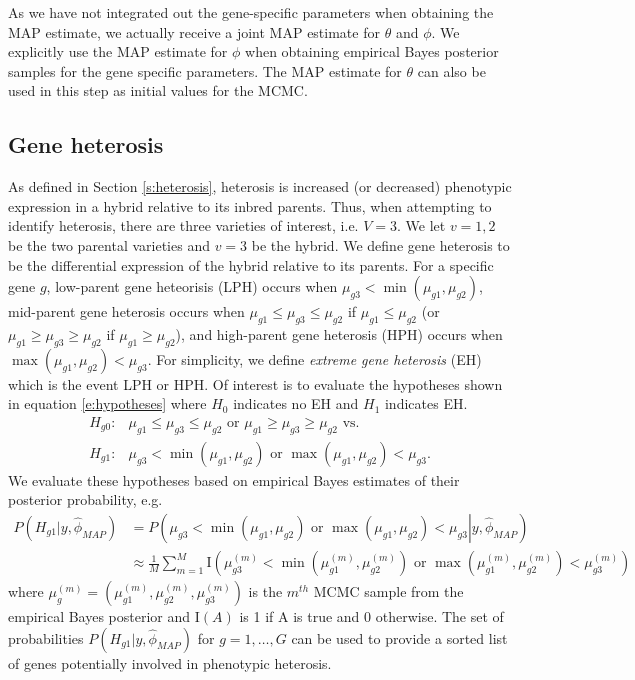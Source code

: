 \documentclass[useAMS,usenatbib,referee]{biom}
\begin{document}
As we have not integrated out the gene-specific parameters when obtaining the MAP estimate, we actually receive a joint MAP estimate for $\theta$ and $\phi$. We explicitly use the MAP estimate for $\phi$ when obtaining empirical Bayes posterior samples for the gene specific parameters. The MAP estimate for $\theta$ can also be used in this step as initial values for the MCMC. 

\subsection{Gene heterosis}
\label{s:gene_heterosis}

As defined in Section \ref{s:heterosis}, heterosis is increased (or decreased) phenotypic expression in a hybrid relative to its inbred parents. Thus, when attempting to identify heterosis, there are three varieties of interest, i.e. $V=3$. We let $v=1,2$ be the two parental varieties and $v=3$ be the hybrid. We define gene heterosis to be the differential expression of the hybrid relative to its parents. For a specific gene $g$, low-parent gene heteorisis (LPH) occurs when $\mu_{g3}< \min(\mu_{g1},\mu_{g2})$, mid-parent gene heterosis occurs when $\mu_{g1}\le \mu_{g3}\le \mu_{g2}$ if $\mu_{g1}\le \mu_{g2}$ (or $\mu_{g1}\ge \mu_{g3}\ge \mu_{g2}$ if $\mu_{g1}\ge \mu_{g2}$), and high-parent gene heterosis (HPH) occurs when $\max(\mu_{g1},\mu_{g2}) < \mu_{g3}$. For simplicity, we define \emph{extreme gene heterosis} (EH) which is the event LPH or HPH. Of interest is to evaluate the hypotheses shown in equation \eqref{e:hypotheses} where $H_0$ indicates no EH and $H_1$ indicates EH. 
\begin{align}
\label{e:hypotheses}
H_{g0}:&\mu_{g1}\le \mu_{g3}\le \mu_{g2} \mbox{ or } \mu_{g1}\ge \mu_{g3}\ge \mu_{g2} \mbox{\ \ vs.\ \ } \nonumber \\
H_{g1}:&\mu_{g3}< \min(\mu_{g1},\mu_{g2}) \mbox{ or } \max(\mu_{g1},\mu_{g2}) < \mu_{g3}.
\end{align}
We evaluate these hypotheses based on empirical Bayes estimates of their posterior probability, e.g. 
\begin{align}
P\left(H_{g1}|y, \hat{\phi}_{MAP}\right) &= P\left(\left.\mu_{g3}< \min(\mu_{g1},\mu_{g2}) \mbox{ or } \max(\mu_{g1},\mu_{g2}) < \mu_{g3}\right| y, \hat{\phi}_{MAP}\right) \nonumber \\
&\approx \frac{1}{M} \sum_{m=1}^M \mathrm{I}\left(\mu_{g3}^{(m)}< \min\left(\mu_{g1}^{(m)},\mu_{g2}^{(m)}\right) \mbox{ or } \max\left(\mu_{g1}^{(m)},\mu_{g2}^{(m)}\right) < \mu_{g3}^{(m)}\right) \label{e:probs}
\end{align}
where $\mu_g^{(m)} = \left(\mu_{g1}^{(m)},\mu_{g2}^{(m)},\mu_{g3}^{(m)}\right)$ is the $m^{th}$ MCMC sample from the empirical Bayes posterior and $\mathrm{I}(A)$ is 1 if A is true and 0 otherwise. The set of probabilities $P\left(H_{g1}|y, \hat{\phi}_{MAP}\right)$ for $g=1,\ldots,G$ can be used to provide a sorted list of genes potentially involved in phenotypic heterosis. 
\end{document}

